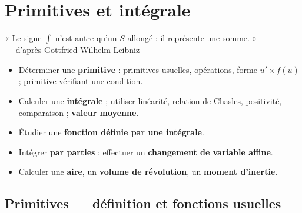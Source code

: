 
\chapter{Primitives et intégrale}

\begin{citationchapitre}
	« Le signe $\displaystyle\int$ n'est autre qu'un $S$ allongé : il
	représente une somme. »\\[0.4em]
	— d'après Gottfried Wilhelm Leibniz
\end{citationchapitre}

\begin{objectifs}
	\begin{itemize}[label=\textbullet]
		\item Déterminer une \textbf{primitive} : primitives usuelles,
		opérations, forme $u'\times f(u)$ ; primitive vérifiant une condition.
		\item Calculer une \textbf{intégrale} ; utiliser linéarité, relation de
		Chasles, positivité, comparaison ; \textbf{valeur moyenne}.
		\item Étudier une \textbf{fonction définie par une intégrale}.
		\item Intégrer \textbf{par parties} ; effectuer un \textbf{changement de
		variable affine}.
		\item Calculer une \textbf{aire}, un \textbf{volume de révolution}, un
		\textbf{moment d'inertie}.
	\end{itemize}
\end{objectifs}


\section{Primitives — définition et fonctions usuelles}

